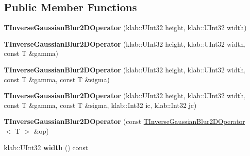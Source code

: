 \subsection*{Public Member Functions}
\begin{DoxyCompactItemize}
\item 
{\bfseries T\+Inverse\+Gaussian\+Blur2\+D\+Operator} (klab\+::\+U\+Int32 height, klab\+::\+U\+Int32 width)\hypertarget{classkl1p_1_1TInverseGaussianBlur2DOperator_a896898ece52f761064d02540f18359f3}{}\label{classkl1p_1_1TInverseGaussianBlur2DOperator_a896898ece52f761064d02540f18359f3}

\item 
{\bfseries T\+Inverse\+Gaussian\+Blur2\+D\+Operator} (klab\+::\+U\+Int32 height, klab\+::\+U\+Int32 width, const T \&gamma)\hypertarget{classkl1p_1_1TInverseGaussianBlur2DOperator_aa71755778cd65e00b1771b7ea1425ce1}{}\label{classkl1p_1_1TInverseGaussianBlur2DOperator_aa71755778cd65e00b1771b7ea1425ce1}

\item 
{\bfseries T\+Inverse\+Gaussian\+Blur2\+D\+Operator} (klab\+::\+U\+Int32 height, klab\+::\+U\+Int32 width, const T \&gamma, const T \&sigma)\hypertarget{classkl1p_1_1TInverseGaussianBlur2DOperator_ac9017db3123e7a8c9213aa132b9fa74f}{}\label{classkl1p_1_1TInverseGaussianBlur2DOperator_ac9017db3123e7a8c9213aa132b9fa74f}

\item 
{\bfseries T\+Inverse\+Gaussian\+Blur2\+D\+Operator} (klab\+::\+U\+Int32 height, klab\+::\+U\+Int32 width, const T \&gamma, const T \&sigma, klab\+::\+Int32 ic, klab\+::\+Int32 jc)\hypertarget{classkl1p_1_1TInverseGaussianBlur2DOperator_a165d4a8668ced91e8622d5036b10dd68}{}\label{classkl1p_1_1TInverseGaussianBlur2DOperator_a165d4a8668ced91e8622d5036b10dd68}

\item 
{\bfseries T\+Inverse\+Gaussian\+Blur2\+D\+Operator} (const \hyperlink{classkl1p_1_1TInverseGaussianBlur2DOperator}{T\+Inverse\+Gaussian\+Blur2\+D\+Operator}$<$ T $>$ \&op)\hypertarget{classkl1p_1_1TInverseGaussianBlur2DOperator_ac088a76d3df58000b81e305d3f3e5b1e}{}\label{classkl1p_1_1TInverseGaussianBlur2DOperator_ac088a76d3df58000b81e305d3f3e5b1e}

\item 
klab\+::\+U\+Int32 {\bfseries width} () const \hypertarget{classkl1p_1_1TInverseGaussianBlur2DOperator_a8daf071b7b207efbfff25bdd76e919c4}{}\label{classkl1p_1_1TInverseGaussianBlur2DOperator_a8daf071b7b207efbfff25bdd76e919c4}


\end{DoxyCompactItemize}
